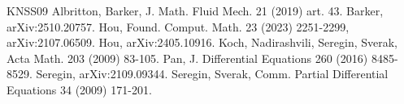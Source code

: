 \documentclass[11pt]{article}
\begin{document}
\begin{thebibliography}{KNSS09}
 Albritton, Barker, J. Math. Fluid Mech. 21 (2019) art. 43.
 Barker, arXiv:2510.20757.
 Hou, Found. Comput. Math. 23 (2023) 2251-2299, arXiv:2107.06509.
 Hou, arXiv:2405.10916.
 Koch, Nadirashvili, Seregin, Sverak, Acta Math. 203 (2009) 83-105.
 Pan, J. Differential Equations 260 (2016) 8485-8529.
 Seregin, arXiv:2109.09344.
 Seregin, Sverak, Comm. Partial Differential Equations 34 (2009) 171-201.
\end{thebibliography}
\end{document}
